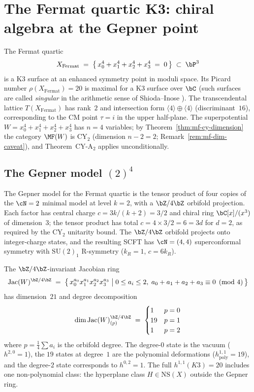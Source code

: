 \section{The Fermat quartic K3: chiral algebra at the Gepner point}
\label{sec:mf-fermat-quartic-k3}

The Fermat quartic
\[
 X_{\mathrm{Fermat}} \;=\; \bigl\{\, x_0^4 + x_1^4 + x_2^4 + x_3^4 \;=\; 0 \,\bigr\} \;\subset\; \bP^3
\]
is a K3 surface at an enhanced symmetry point in moduli space. Its Picard number $\rho(X_{\mathrm{Fermat}}) = 20$ is maximal for a K3 surface over $\bC$ (such surfaces are called \emph{singular} in the arithmetic sense of Shioda--Inose \cite{ShiodaInose1977}). The transcendental lattice $T(X_{\mathrm{Fermat}})$ has rank~$2$ and intersection form $\langle 4 \rangle \oplus \langle 4 \rangle$ (discriminant~$16$), corresponding to the CM point $\tau = i$ in the upper half-plane. The superpotential $W = x_0^4 + x_1^4 + x_2^4 + x_3^4$ has $n = 4$ variables; by Theorem~\ref{thm:mf-cy-dimension} the category $\MF(W)$ is CY$_2$ (dimension $n - 2 = 2$; Remark~\ref{rem:mf-dim-caveat}), and Theorem~CY-A$_2$ applies unconditionally.

\subsection{The Gepner model \texorpdfstring{$(2)^4$}{(2)-4}}
\label{subsec:mf-fermat-gepner}

The Gepner model for the Fermat quartic is the tensor product of four copies of the $\cN = 2$ minimal model at level $k = 2$, with a $\bZ/4\bZ$ orbifold projection. Each factor has central charge $c = 3k/(k+2) = 3/2$ and chiral ring $\bC[x]/(x^3)$ of dimension~$3$; the tensor product has total $c = 4 \times 3/2 = 6 = 3d$ for $d = 2$, as required by the CY$_2$ unitarity bound. The $\bZ/4\bZ$ orbifold projects onto integer-charge states, and the resulting SCFT has $\cN = (4,4)$ superconformal symmetry with $\mathrm{SU}(2)_1$ R-symmetry ($k_R = 1$, $c = 6k_R$).

\begin{proposition}
\label{prop:mf-fermat-gepner-ring}
The $\bZ/4\bZ$-invariant Jacobian ring
\[
 \mathrm{Jac}(W)^{\bZ/4\bZ} \;=\; \bigl\{\, x_0^{a_0} x_1^{a_1} x_2^{a_2} x_3^{a_3} \;\big|\; 0 \leq a_i \leq 2,\; a_0 + a_1 + a_2 + a_3 \equiv 0 \pmod{4} \,\bigr\}
\]
has dimension~$21$ and degree decomposition
\[
 \dim \mathrm{Jac}(W)^{\bZ/4\bZ}_{(p)} \;=\; \begin{cases} 1 & p = 0 \\ 19 & p = 1 \\ 1 & p = 2 \end{cases}
\]
where $p = \tfrac{1}{4}\sum a_i$ is the orbifold degree. The degree-$0$ state is the vacuum ($h^{2,0} = 1$), the $19$ states at degree~$1$ are the polynomial deformations ($h^{1,1}_{\mathrm{poly}} = 19$), and the degree-$2$ state corresponds to $h^{0,2} = 1$. The full $h^{1,1}(K3) = 20$ includes one non-polynomial class: the hyperplane class $H \in \mathrm{NS}(X)$ outside the Gepner ring.
\end{proposition}

